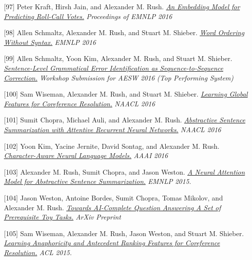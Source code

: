 \documentclass[10pt]{article}
\begin{document}
\medskip


[97] \ind Peter Kraft, Hirsh Jain, and Alexander M. Rush. \emph{\href{ https://www.aclweb.org/anthology/D/D16/D16-1221.pdf }{ An Embedding Model for Predicting Roll-Call Votes.} }\emph{ Proceedings of EMNLP 2016 }

\medskip


[98] \ind Allen Schmaltz, Alexander M. Rush, and Stuart M. Shieber. \emph{\href{ https://arxiv.org/abs/1604.08633 }{ Word Ordering Without Syntax.} }\emph{ EMNLP 2016 }

\medskip


[99] \ind Allen Schmaltz, Yoon Kim, Alexander M. Rush, and Stuart M. Shieber. \emph{\href{ /papers/aesw2016.pdf }{ Sentence-Level Grammatical Error Identification as Sequence-to-Sequence Correction.} }\emph{ Workshop Submission for AESW 2016 (Top Performing System) }

\medskip


[100] \ind Sam Wiseman, Alexander M. Rush, and Stuart M. Shieber. \emph{\href{ /papers/corefmain.pdf }{ Learning Global Features for Coreference Resolution.} }\emph{ NAACL 2016 }

\medskip


[101] \ind Sumit Chopra, Michael Auli, and Alexander M. Rush. \emph{\href{ /papers/naacl16_summary.pdf }{ Abstractive Sentence Summarization with Attentive Recurrent Neural Networks.} }\emph{ NAACL 2016 }

\medskip


[102] \ind Yoon Kim, Yacine Jernite, David Sontag, and Alexander M. Rush. \emph{\href{ https://arxiv.org/pdf/1508.06615v4 }{ Character-Aware Neural Language Models.} }\emph{ AAAI 2016 }

\medskip


[103] \ind Alexander M. Rush, Sumit Chopra, and Jason Weston. \emph{\href{ http://arxiv.org/pdf/1509.00685.pdf }{ A Neural Attention Model for Abstractive Sentence Summarization.} }\emph{ EMNLP 2015. }

\medskip


[104] \ind Jason Weston, Antoine Bordes, Sumit Chopra, Tomas Mikolov, and Alexander M. Rush. \emph{\href{ http://arxiv.org/pdf/1502.05698.pdf }{ Towards AI-Complete Question Answering A Set of Prerequisite Toy Tasks.} }\emph{ ArXiv Preprint }

\medskip


[105] \ind Sam Wiseman, Alexander M. Rush, Jason Weston, and Stuart M. Shieber. \emph{\href{ http://people.seas.harvard.edu/~srush/acl15.pdf }{ Learning Anaphoricity and Antecedent Ranking Features for Coreference Resolution.} }\emph{ ACL 2015. }
\end{document}
